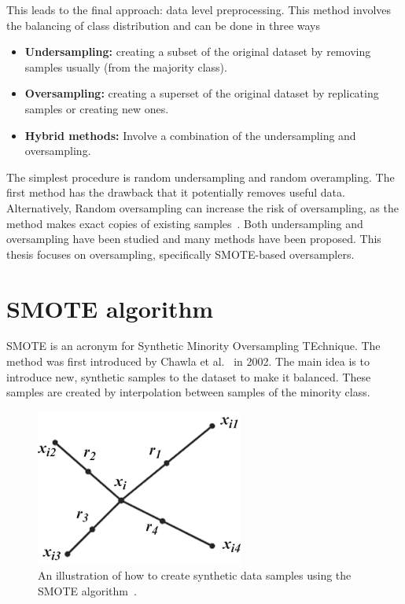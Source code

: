 This leads to the final approach: data level preprocessing. This method involves the balancing of class distribution and can be done in three ways~\cite{Batista2004AData}
\begin{itemize}
    \item \textbf{Undersampling:} creating a subset of the original dataset by removing samples usually (from the majority class).
    \item \textbf{Oversampling:} creating a superset of the original dataset by replicating samples or creating new ones.
    \item \textbf{Hybrid methods:} Involve a combination of the undersampling and oversampling.
\end{itemize}
The simplest procedure is random undersampling and random overampling. The first method has the drawback that it potentially removes useful data. Alternatively, Random oversampling can increase the risk of oversampling, as the method makes exact copies of existing samples~\cite{Fernandez2018LearningSets}. Both undersampling and oversampling have been studied and many methods have been proposed. This thesis focuses on oversampling, specifically SMOTE-based oversamplers.

\section{SMOTE algorithm}
SMOTE is an acronym for Synthetic Minority Oversampling TEchnique. The method was first introduced by Chawla et al.~\cite{Chawla2002SMOTE:Technique} in 2002. The main idea is to introduce new, synthetic samples to the dataset to make it balanced. These samples are created by interpolation between samples of the minority class. 

\begin{figure}
    \centering
    \includegraphics[width=.4\textwidth]{Thesis/Figures/SMOTE_alg.png}
    \caption{An illustration of how to create synthetic data samples using the SMOTE algorithm~\cite{Fernandez2018LearningSets}.}
    \label{fig:SMOTE}
\end{figure}

